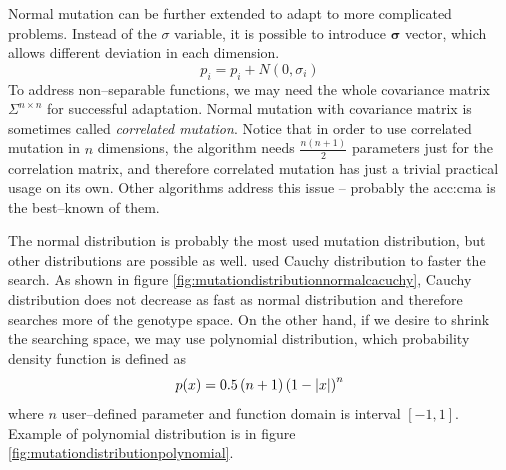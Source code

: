 Normal mutation can be further extended to adapt to more complicated problems. Instead of the $\sigma$ variable, it is possible to introduce $\boldsymbol{\sigma}$ vector, which allows different deviation in each dimension.
$$
p_i = p_i + N(0,\sigma_i)
$$ 
To address non--separable functions, we may need the whole covariance matrix $\Sigma^{n \times n}$ for successful adaptation. Normal mutation with covariance matrix is sometimes called \emph{correlated mutation}. Notice that in order to use correlated mutation in $n$ dimensions, the algorithm needs $\frac{n\left(n+1\right)}{2}$ parameters just for the correlation matrix, and therefore correlated mutation has just a trivial practical usage on its own. Other algorithms address this issue -- probably the \acrfull{acc:cma} is the best--known of them.

The normal distribution is probably the most used mutation distribution, but other distributions are possible as well. \citet*{CauchyDistributionMutation} used Cauchy distribution to faster the search. As shown in figure \ref{fig:mutationdistributionnormalcacuchy}, Cauchy distribution does not decrease as fast as normal distribution and therefore searches more of the genotype space. On the other hand, if we desire to shrink the searching space, we may use polynomial distribution, which probability density function is defined as
$$
p(x)=0.5 \left(n + 1\right)\left( 1 - \left|{x}\right| \right)^n
$$ 
where $n$ user--defined parameter and function domain is interval $\left[-1,1\right]$. Example of polynomial distribution is in figure \ref{fig:mutationdistributionpolynomial}.

